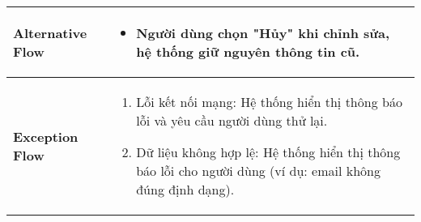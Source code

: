 \begin{longtable}[H]{|l|p{}|}
    \hline
    
    \textbf{Alternative Flow} & \vspace{-0.75cm} \begin{itemize}[leftmargin=4mm]
        \item Người dùng chọn "Hủy" khi chỉnh sửa, hệ thống giữ nguyên thông tin cũ.
    \end{itemize} \\
    
    \hline
    
    \textbf{Exception Flow} & \vspace{-0.75cm} \begin{enumerate}[leftmargin=5.5mm]
        \setlength\itemsep{0em}
        \item Lỗi kết nối mạng: Hệ thống hiển thị thông báo lỗi và yêu cầu người dùng thử lại.
        \item Dữ liệu không hợp lệ: Hệ thống hiển thị thông báo lỗi cho người dùng (ví dụ: email không đúng định dạng).
    \end{enumerate}\\
    \hline 
\end{longtable}

